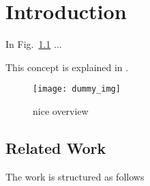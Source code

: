 \chapter{Introduction}

In Fig.~\ref{fig:dummy} ...

This concept is explained in \cite{langid}.

\begin{figure}[tb] 
    \centering
    \texttt{[image: dummy\_img]}
    \caption{nice overview} %
    \label{fig:dummy}
\end{figure}

\section{Related Work}


The work is structured as follows 
